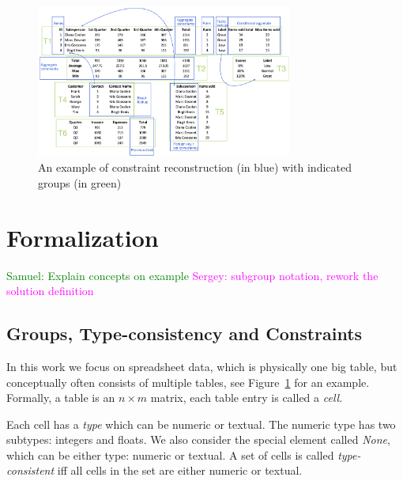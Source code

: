 \documentclass{ecai}
\newcommand{\sergey}[1]{\textcolor{magenta}{{\sc Sergey:} #1}\xspace}
\newcommand{\samuel}[1]{\textcolor{green}{{\sc Samuel:} #1}\xspace}
\begin{document}
\begin{figure}[tbh]
  \begin{center}
    \includegraphics[width=0.75\textwidth]{figures/Demo.png}
  \end{center}
  \vspace{-10pt}
  \caption{An example of constraint reconstruction (in blue) with indicated groups (in green)}
  \label{fig:main_example}
\end{figure}

\section{Formalization}
\samuel{Explain concepts on example}
\sergey{subgroup notation, rework the solution definition}
\subsection{Groups, Type-consistency and Constraints}
In this work we focus on spreadsheet data, which is physically one big table, but conceptually often consists of multiple tables, see Figure~\ref{fig:main_example} for an example.
Formally, a table is an $n \times m$ matrix, each table entry is called  a \textit{cell}.

Each cell has a {\em type} which can be numeric or textual.
The numeric type has two subtypes: integers and floats.
We also consider the special element called \textit{None}, which can be either type: numeric or textual.
A set of cells is called \textit{type-consistent} iff all cells in the set are either numeric or textual.
\end{document}
